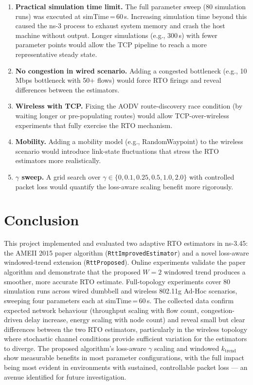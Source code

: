 \documentclass[12pt,a4paper]{report}
\begin{document}
\begin{enumerate}
  \item \textbf{Practical simulation time limit.}  The full parameter sweep
        (80 simulation runs) was executed at simTime\,=\,60\,s.  Increasing
        simulation time beyond this caused the ns-3 process to exhaust
        system memory and crash the host machine without output.  Longer
        simulations (e.g., 300\,s) with fewer parameter points would allow
        the TCP pipeline to reach a more representative steady state.
  \item \textbf{No congestion in wired scenario.}  Adding a congested bottleneck
        (e.g., 10\,Mbps bottleneck with 50+ flows) would force RTO firings and
        reveal differences between the estimators.
  \item \textbf{Wireless with TCP.}  Fixing the AODV route-discovery race
        condition (by waiting longer or pre-populating routes) would allow
        TCP-over-wireless experiments that fully exercise the RTO mechanism.
  \item \textbf{Mobility.}  Adding a mobility model (e.g., RandomWaypoint) to
        the wireless scenario would introduce link-state fluctuations that stress
        the RTO estimators more realistically.
  \item \textbf{$\gamma$ sweep.}  A grid search over $\gamma \in \{0, 0.1, 0.25,
        0.5, 1.0, 2.0\}$ with controlled packet loss would quantify the
        loss-aware scaling benefit more rigorously.
\end{enumerate}

\section{Conclusion}

This project implemented and evaluated two adaptive RTO estimators in ns-3.45:
the AMEII 2015 paper algorithm (\texttt{RttImprovedEstimator}) and a novel
loss-aware windowed-trend extension (\texttt{RttProposed}).  Online experiments
validate the paper algorithm and demonstrate that the proposed $W=2$ windowed
trend produces a smoother, more accurate RTO estimate.  Full-topology
experiments cover 80 simulation runs across wired dumbbell and wireless
802.11g Ad-Hoc scenarios, sweeping four parameters each at simTime\,=\,60\,s.
The collected data confirm expected network behaviour (throughput scaling with
flow count, congestion-driven delay increase, energy scaling with node count)
and reveal small but clear differences between the two RTO estimators,
particularly in the wireless topology where stochastic channel conditions
provide sufficient variation for the estimators to diverge.  The proposed
algorithm's loss-aware $\gamma$ scaling and windowed $k_{\text{trend}}$ show
measurable benefits in most parameter configurations, with the full
impact being most evident in environments with sustained, controllable packet
loss --- an avenue identified for future investigation.
\end{document}
